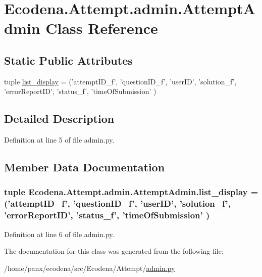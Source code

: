 \hypertarget{class_ecodena_1_1_attempt_1_1admin_1_1_attempt_admin}{
\section{Ecodena.Attempt.admin.AttemptAdmin Class Reference}
\label{da/d7b/class_ecodena_1_1_attempt_1_1admin_1_1_attempt_admin}
}
\subsection*{Static Public Attributes}
\begin{DoxyCompactItemize}
\item 
tuple \hyperlink{class_ecodena_1_1_attempt_1_1admin_1_1_attempt_admin_aba3a1a0a1c79cd7401f82b6775d6aa75}{list\_\-display} = ('attemptID\_\-f', 'questionID\_\-f', 'userID', 'solution\_\-f', 'errorReportID', 'status\_\-f', 'timeOfSubmission' )
\end{DoxyCompactItemize}


\subsection{Detailed Description}


Definition at line 5 of file admin.py.



\subsection{Member Data Documentation}
\hypertarget{class_ecodena_1_1_attempt_1_1admin_1_1_attempt_admin_aba3a1a0a1c79cd7401f82b6775d6aa75}{
\subsubsection[{list\_\-display}]{\setlength{\rightskip}{0pt plus 5cm}tuple {\bf Ecodena.Attempt.admin.AttemptAdmin.list\_\-display} = ('attemptID\_\-f', 'questionID\_\-f', 'userID', 'solution\_\-f', 'errorReportID', 'status\_\-f', 'timeOfSubmission' )}}
\label{da/d7b/class_ecodena_1_1_attempt_1_1admin_1_1_attempt_admin_aba3a1a0a1c79cd7401f82b6775d6aa75}


Definition at line 6 of file admin.py.



The documentation for this class was generated from the following file:\begin{DoxyCompactItemize}
\item 
/home/panx/ecodena/src/Ecodena/Attempt/\hyperlink{_attempt_2admin_8py}{admin.py}\end{DoxyCompactItemize}
